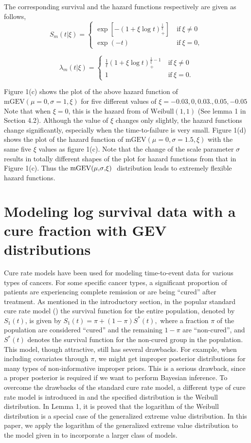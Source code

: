 \documentclass[smallextended]{svjour3}       %
\begin{document}
{The corresponding survival and the hazard functions respectively are given as follows,
\[
S_m(t|\xi)=\begin{cases}
\exp[-(1+\xi\log t)_{+}^{\frac{1}{\xi}}]\  & \mbox{if}\ \xi\neq0\\
\exp(-t) & \mbox{if}\ \xi=0,
\end{cases}
\]


\[
\lambda_m(t|\xi)=\begin{cases}
\frac{1}{t}(1+\xi\log t)_{+}^{\frac{1}{\xi}-1}\  & \mbox{if}\ \xi\neq0\\
1 & \mbox{if}\ \xi=0.
\end{cases}
\]


Figure 1(c) shows the plot of the above hazard function of $\mbox{mGEV}(\mu=0,\sigma=1,\xi)$
for five different values of $\xi = -0.03,0,0.03.,0.05,-0.05$ Note that when $\xi=0$, this is the hazard from of $\mbox{Weibull}(1,1)$
(See lemma 1 in Section 4.2). Although the value of $\xi$ changes only slightly, the hazard functions change
significantly, especially when the time-to-failure is very small. Figure 1(d) shows the plot of the hazard function of $\mbox{mGEV}(\mu=0,\sigma=1.5,\xi)$
with the same five $\xi$  values as figure 1(c). Note that the
change of the scale parameter $\sigma$ results in totally different shapes of the plot for hazard functions from that in Figure 1(c). Thus
the $\mbox{mGEV(\ensuremath{\mu},\ensuremath{\sigma},\ensuremath{\xi}) }$ distribution leads to
extremely flexible hazard functions.

\section{Modeling log survival data with a cure fraction with GEV distributions}
\label{sec:sur}
Cure rate models have been used for modeling time-to-event data for
various types of cancers. For some specific cancer types, a significant proportion
of patients are experiencing complete remission or are being ``cured'' after treatment. As mentioned in the introductory section, in the popular 
standard cure rate model (\citet{berk:gage:1952}) the survival function for
the entire population, denoted by $S_{1}(t)$, is given by $S_{1}(t)=\pi+(1-\pi)S^{*}(t),$
where a fraction $\pi$ of the population are considered ``cured''
and the remaining $1-\pi$ are ``non-cured'', and $S^{*}(t)$ denotes
the survival function for the non-cured group in the population.
This model, though attractive, still has several drawbacks. For
example, when including covariates through $\pi$, we might get improper
posterior distributions for many types of non-informative improper
priors. This is a serious drawback, since a proper posterior is required
if we want to perform Bayesian inference. To overcome the drawbacks
of the standard cure rate model, a different type of cure rate model is
introduced in \citet{chen:ibra:sinh:1999} and the specified
distribution is the Weibull distribution. In Lemma 1, it is proved that
the logarithm of the Weibull distribution is a special case of the generalized
extreme value distribution. In this paper, we apply the logarithm of the generalized
extreme value distribution to the model given in \citet{chen:ibra:sinh:1999} to incorporate a larger class of models.


}
\end{document}
